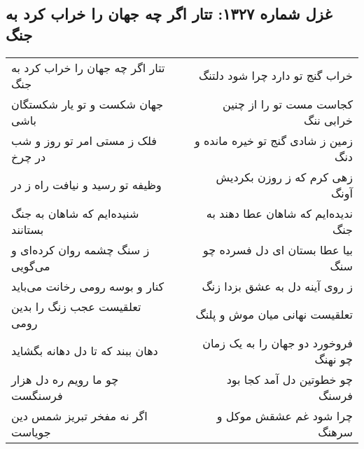 \begin{center}
\section*{غزل شماره ۱۳۲۷: تتار اگر چه جهان را خراب کرد به جنگ}
\label{sec:1327}
\begin{longtable}{l p{0.5cm} r}
تتار اگر چه جهان را خراب کرد به جنگ
&&
خراب گنج تو دارد چرا شود دلتنگ
\\
جهان شکست و تو یار شکستگان باشی
&&
کجاست مست تو را از چنین خرابی ننگ
\\
فلک ز مستی امر تو روز و شب در چرخ
&&
زمین ز شادی گنج تو خیره مانده و دنگ
\\
وظیفه تو رسید و نیافت راه ز در
&&
زهی کرم که ز روزن بکردیش آونگ
\\
شنیده‌ایم که شاهان به جنگ بستانند
&&
ندیده‌ایم که شاهان عطا دهند به جنگ
\\
ز سنگ چشمه روان کرده‌ای و می‌گویی
&&
بیا عطا بستان ای دل فسرده چو سنگ
\\
کنار و بوسه رومی رخانت می‌باید
&&
ز روی آینه دل به عشق بزدا زنگ
\\
تعلقیست عجب زنگ را بدین رومی
&&
تعلقیست نهانی میان موش و پلنگ
\\
دهان ببند که تا دل دهانه بگشاید
&&
فروخورد دو جهان را به یک زمان چو نهنگ
\\
چو ما رویم ره دل هزار فرسنگست
&&
چو خطوتین دل آمد کجا بود فرسنگ
\\
اگر نه مفخر تبریز شمس دین جویاست
&&
چرا شود غم عشقش موکل و سرهنگ
\\
\end{longtable}
\end{center}
